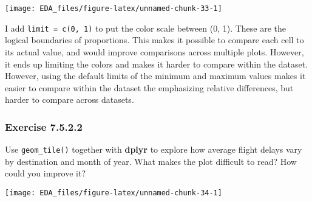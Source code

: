 \documentclass[]{book}
\newenvironment{Shaded}{\begin{snugshade}}{\end{snugshade}}
\newcommand{\DataTypeTok}[1]{\textcolor[rgb]{0.13,0.29,0.53}{#1}}
\newcommand{\KeywordTok}[1]{\textcolor[rgb]{0.13,0.29,0.53}{\textbf{#1}}}
\newcommand{\NormalTok}[1]{#1}
\newcommand{\OperatorTok}[1]{\textcolor[rgb]{0.81,0.36,0.00}{\textbf{#1}}}
\newcommand{\OtherTok}[1]{\textcolor[rgb]{0.56,0.35,0.01}{#1}}
\newcommand{\StringTok}[1]{\textcolor[rgb]{0.31,0.60,0.02}{#1}}
\theoremstyle{plain}
\theoremstyle{remark}
\theoremstyle{definition}
\theoremstyle{definition}
\theoremstyle{definition}
\theoremstyle{remark}
\begin{document}
\begin{center}\texttt{[image: EDA\_files/figure-latex/unnamed-chunk-33-1]} \end{center}

I add \texttt{limit\ =\ c(0,\ 1)} to put the color scale between (0, 1).
These are the logical boundaries of proportions. This makes it possible
to compare each cell to its actual value, and would improve comparisons
across multiple plots. However, it ends up limiting the colors and makes
it harder to compare within the dataset. However, using the default
limits of the minimum and maximum values makes it easier to compare
within the dataset the emphasizing relative differences, but harder to
compare across datasets.

\hypertarget{exercise-7.5.2.2}{%
\subsubsection*{\texorpdfstring{Exercise
{7.5.2.2}}{Exercise 7.5.2.2}}\label{exercise-7.5.2.2}}

Use \texttt{geom\_tile()} together with \textbf{dplyr} to explore how
average flight delays vary by destination and month of year. What makes
the plot difficult to read? How could you improve it?

\begin{Shaded}
\end{Shaded}

\begin{center}\texttt{[image: EDA\_files/figure-latex/unnamed-chunk-34-1]} \end{center}
\end{document}
